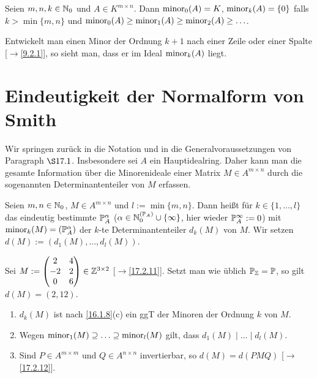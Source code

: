 \documentclass[../../main.tex]{subfiles}
\begin{document}
\begin{pro}\label{17.2.13}
    Seien $m,n,k\in\N_0$ und $A\in K^{m\times n}$. Dann $\minor_0(A)=K$, $\minor_k(A)=\{0\}$ falls $k>\min\{m,n\}$ und $\minor_0(A)\ge \minor_1(A)\ge\minor_2(A)\ge\ldots $.
\end{pro}
\begin{cproof}
    Entwickelt man einen Minor der Ordnung $k+1$ nach einer Zeile oder einer Spalte [$\to$\ref{9.2.1}], so sieht man, dass er im Ideal $\minor_k(A)$ liegt.
\end{cproof}

\section{Eindeutigkeit der Normalform von Smith}

Wir springen zurück in die Notation und in die Generalvoraussetzungen von Paragraph $\S 17.1$. Insbesondere sei $A$ ein Hauptidealring. Daher kann man die gesamte Information über die Minorenideale einer Matrix $M\in A^{m\times n}$ durch die sogenannten Determinantenteiler von $M$ erfassen.

\begin{df}\label{17.3.1}
    Seien $m,n\in \N_0$, $M\in A^{m\times n}$ und $l:=\min\{m,n\}$. Dann heißt für $k\in\{1,\ldots ,l\}$ das eindeutig bestimmte $\P_A^\alpha$ ($\alpha\in\expfam\cup\{\infty\}$, hier wieder $\P_A^\infty:=0$) mit $\minor_k(M)=(\P_A^\alpha)$ der $k$-te Determinantenteiler $d_k(M)$ von $M$. Wir setzen $d(M):=(d_1(M),\ldots ,d_l(M))$.
\end{df}

\begin{bsp}\label{17.3.2}
    Sei $M:=\begin{pmatrix}2 & 4\\-2&2\\0&6\end{pmatrix}\in \Z^{3\times 2}$ [$\to$\ref{17.2.11}]. Setzt man wie üblich $\P_\Z=\P$, so gilt $d(M)=(2,12)$.
\end{bsp}

\begin{bem}\label{17.3.3}
    \begin{enumerate}[\normalfont(a)]
        \item $d_k(M)$ ist nach \ref{16.1.8}(c) ein ggT der Minoren der Ordnung $k$ von $M$.
        \item Wegen $\minor_1(M)\supseteq\ldots \supseteq \minor_l(M)$ gilt, dass $d_1(M)\mid\ldots \mid d_l(M)$.
        \item Sind $P\in A^{m\times m}$ und $Q\in A^{n\times n}$ invertierbar, so $d(M)=d(PMQ)$ [$\to$\ref{17.2.12}].
    \end{enumerate}
\end{bem}
\end{document}
